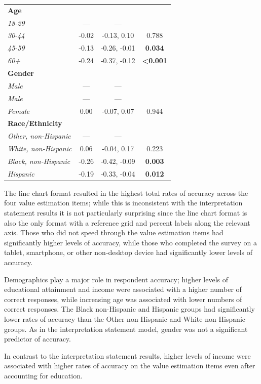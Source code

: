 \documentclass{IEEEcsmag}
\begin{document}
\begin{table}
\begin{tabular}{lccc}
\textbf{Age} &  &  & \\
\textit{18-29} & — & — & \\
\textit{30-44} & -0.02 & -0.13, 0.10 & 0.788\\
\textit{45-59} & -0.13 & -0.26, -0.01 & \textbf{0.034}\\\textit{60+} & -0.24 & -0.37, -0.12 & \textbf{<0.001}\\
\textbf{Gender} &  &  & \\
\textit{Male} & — & — & \\
\textit{Male} & — & — & \\
\textit{Female} & 0.00 & -0.07, 0.07 & 0.944\\\textbf{Race/Ethnicity} &  &  & \\
\textit{Other, non-Hispanic} & — & — & \\
\textit{White, non-Hispanic} & 0.06 & -0.04, 0.17 & 0.223\\
\textit{Black, non-Hispanic} & -0.26 & -0.42, -0.09 & \textbf{0.003}\\
\textit{Hispanic} & -0.19 & -0.33, -0.04 & \textbf{0.012}\\
\bottomrule
\end{tabular}

\end{table}

The line chart format resulted in the highest total rates of accuracy across the four value estimation items; while this is inconsistent with the interpretation statement results it is not particularly surprising since the line chart format is also the only format with a reference grid and percent labels along the relevant axis. Those who did not speed through the value estimation items had significantly higher levels of accuracy, while those who completed the survey on a tablet, smartphone, or other non-desktop device had significantly lower levels of accuracy.

Demographics play a major role in respondent accuracy; higher levels of educational attainment and income were associated with a higher number of correct responses, while increasing age was associated with lower numbers of correct responses. The Black non-Hispanic and Hispanic groups had significantly lower rates of accuracy than the Other non-Hispanic and White non-Hispanic groups. As in the interpretation statement model, gender was not a significant predictor of accuracy.

In contrast to the interpretation statement results, higher levels of income were associated with higher rates of accuracy on the value estimation items even after accounting for education.
\end{document}
